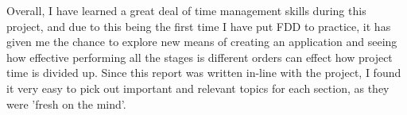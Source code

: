 Overall, I have learned a great deal of time management skills during this project, and due to this being the first time I have put FDD to practice, it has given me the chance to explore new means of creating an application and seeing how effective performing all the stages is different orders can effect how project time is divided up. Since this report was written in-line with the project, I found it very easy to pick out important and relevant topics for each section, as they were 'fresh on the mind'.
